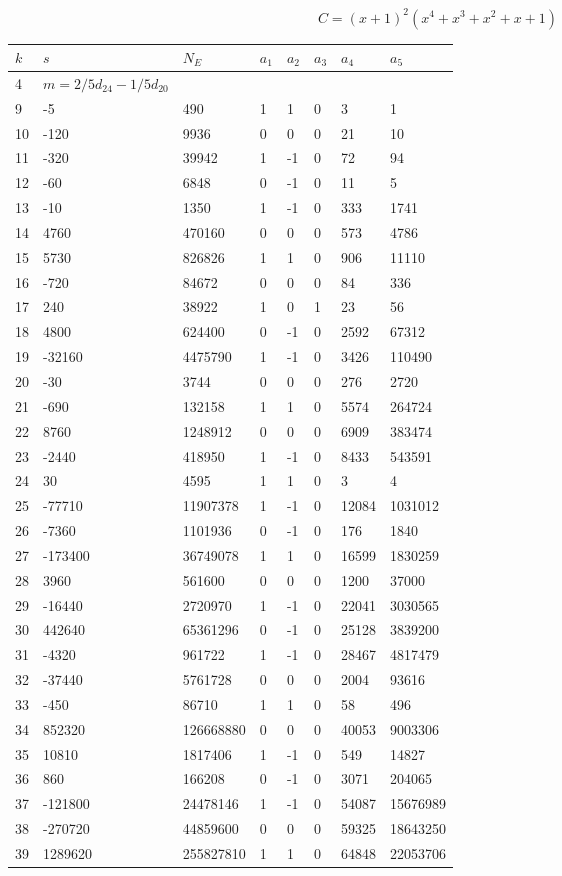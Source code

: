 \documentclass{amsart}
\begin{document}
$$C=(x
 + 1)^{2}(x^4
 + x^3
 + x^2
 + x
 + 1)$$
\begin{longtable}{|l|l|l|lllll|}
\hline
$k$ & $s$ & $N_E$ & $a_1$ & $a_2$ & $a_3$ & $a_4$ & $a_5$\\
\hline
4&$m=2/5d_{24}-1/5d_{20}$&&\multicolumn{5}{c|}{}\\
9&-5&490&1&1&0&3&1\\
10&-120&9936&0&0&0&21&10\\
11&-320&39942&1&-1&0&72&94\\
12&-60&6848&0&-1&0&11&5\\
13&-10&1350&1&-1&0&333&1741\\
14&4760&470160&0&0&0&573&4786\\
15&5730&826826&1&1&0&906&11110\\
16&-720&84672&0&0&0&84&336\\
17&240&38922&1&0&1&23&56\\
18&4800&624400&0&-1&0&2592&67312\\
19&-32160&4475790&1&-1&0&3426&110490\\
20&-30&3744&0&0&0&276&2720\\
21&-690&132158&1&1&0&5574&264724\\
22&8760&1248912&0&0&0&6909&383474\\
23&-2440&418950&1&-1&0&8433&543591\\
24&30&4595&1&1&0&3&4\\
25&-77710&11907378&1&-1&0&12084&1031012\\
26&-7360&1101936&0&-1&0&176&1840\\
27&-173400&36749078&1&1&0&16599&1830259\\
28&3960&561600&0&0&0&1200&37000\\
29&-16440&2720970&1&-1&0&22041&3030565\\
30&442640&65361296&0&-1&0&25128&3839200\\
31&-4320&961722&1&-1&0&28467&4817479\\
32&-37440&5761728&0&0&0&2004&93616\\
33&-450&86710&1&1&0&58&496\\
34&852320&126668880&0&0&0&40053&9003306\\
35&10810&1817406&1&-1&0&549&14827\\
36&860&166208&0&-1&0&3071&204065\\
37&-121800&24478146&1&-1&0&54087&15676989\\
38&-270720&44859600&0&0&0&59325&18643250\\
39&1289620&255827810&1&1&0&64848&22053706\\

\end{longtable}
\end{document}
